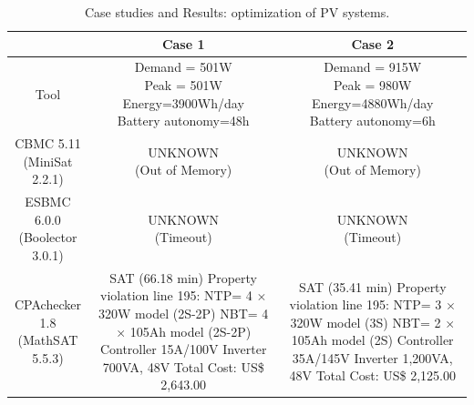 \documentclass[10pt,conference]{IEEEtran}
\begin{document}
\begin{table}
\caption{Case studies and Results: optimization of PV systems.}\label{tab1}
\begin{scriptsize}
\begin{tabular}{|c|c|c|}
\hline
\hline
 & Case 1 & Case 2\\
\hline
\hline
Tool & \makecell{Demand = 501W \\ Peak = 501W \\ Energy=3900Wh/day \\ Battery autonomy=48h} & \makecell{Demand = 915W \\ Peak = 980W \\ Energy=4880Wh/day \\ Battery autonomy=6h}\\
\hline
\makecell{CBMC 5.11 \\(MiniSat 2.2.1)} & \makecell{UNKNOWN \\(Out of Memory)} & \makecell{UNKNOWN \\(Out of Memory)}\\
\hline
\makecell{ESBMC 6.0.0 \\(Boolector 3.0.1)} & \makecell{UNKNOWN \\(Timeout)} & \makecell{UNKNOWN \\(Timeout)} \\
\hline
\makecell{CPAchecker 1.8 \\(MathSAT 5.5.3)} & \makecell{SAT (66.18 min) \\ Property violation line 195: \\NTP= 4 $\times$ 320W model (2S-2P)\\NBT= 4 $\times$ 105Ah model (2S-2P)\\ Controller 15A/100V\\Inverter 700VA, 48V \\ Total Cost: US\$ 2,643.00} & \makecell {SAT (35.41 min) \\ Property violation line 195:  \\NTP= 3 $\times$ 320W model (3S)\\NBT= 2 $\times$ 105Ah model (2S)\\ Controller 35A/145V \\ Inverter 1,200VA, 48V \\ Total Cost: US\$ 2,125.00}\\
\hline
\hline
\end{tabular}
\end{scriptsize}
\end{table}
\end{document}
